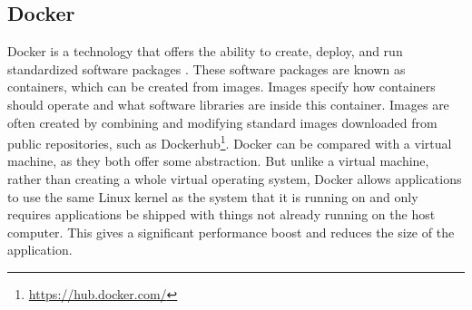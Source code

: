 \subsection{Docker}
Docker is a technology that offers the ability to create, deploy, and run standardized software packages \cite{docker}. These software packages are known as containers, which can be created from images. Images specify how containers should operate and what software libraries are inside this container. Images are often created by combining and modifying standard images downloaded from public repositories, such as Dockerhub\footnote{\url{https://hub.docker.com/}}. Docker can be compared with a virtual machine, as they both offer some abstraction.  But unlike a virtual machine, rather than creating a whole virtual operating system, Docker allows applications to use the same Linux kernel as the system that it is running on and only requires applications be shipped with things not already running on the host computer. This gives a significant performance boost and reduces the size of the application.